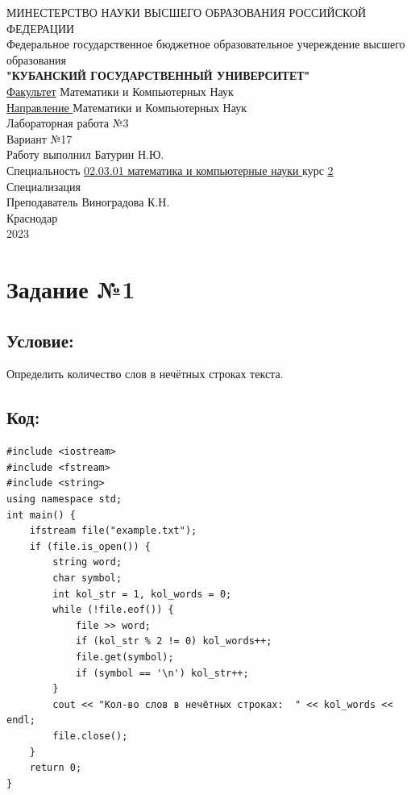 \documentclass[a4paper]{article}
\begin{document}
\begin{center}
\hfill \break
{\large МИНЕСТЕРСТВО НАУКИ ВЫСШЕГО ОБРАЗОВАНИЯ РОССИЙСКОЙ ФЕДЕРАЦИИ}\\
{\large Федеральное государственное бюджетное образовательное учереждение высшего образования}\\
\hfill \break
{\large \textbf{"КУБАНСКИЙ ГОСУДАРСТВЕННЫЙ УНИВЕРСИТЕТ"}} \\
\hfill \break
{\large \underline {Факультет}}\: Математики и Компьютерных Наук\\
{\large \underline {Направление }}\: Математики и Компьютерных Наук\\

\hfill \break
\hfill \break
\hfill \break
{\Large Лабораторная работа №3}\\
{\Large Вариант  №17}\\
\hfill \break \hfill \break
\hfill \break \hfill \break
Работу выполнил \underline{\hspace{7cm}} Батурин Н.Ю.\\
\hfill \break
Специальность \underline{02.03.01 математика и компьютерные науки } курс \underline{ 2}\\
\hfill \break
Специализация \underline{\hspace{11cm}}\\
\hfill \break
Преподаватель \underline{\hspace{6cm}} Виноградова К.Н.\\
\hfill \break
\hfill \break 
\hfill \break \hfill \break
Краснодар\\
2023
\end{center}
\thispagestyle{empty}
\newpage
\begin{center}
\tableofcontents
\end{center}
\newpage
\section{Задание №1} 
\subsection{Условие:}
Определить количество слов в нечётных строках текста.
\subsection{Код:}
\scriptsize
\begin{verbatim}
#include <iostream>
#include <fstream>
#include <string>
using namespace std;
int main() {
    ifstream file("example.txt");
    if (file.is_open()) {
        string word;
        char symbol;
        int kol_str = 1, kol_words = 0;
        while (!file.eof()) {
            file >> word;
            if (kol_str % 2 != 0) kol_words++;
            file.get(symbol);
            if (symbol == '\n') kol_str++;
        }
        cout << "Кол-во слов в нечётных строках:  " << kol_words << endl;
        file.close();
    }
    return 0;
}\end{verbatim}\normalsize
\end{document}
